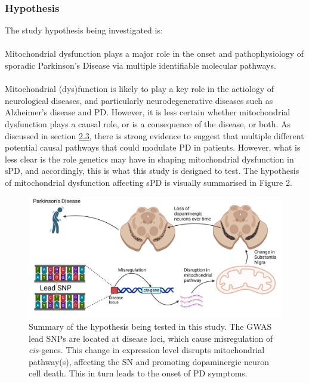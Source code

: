 \documentclass{article}
\begin{document}
\subsubsection{Hypothesis}
\label{subsubsec:hypothesis}
The study hypothesis being investigated is:
\\
\\
Mitochondrial dysfunction plays a major role in the onset and pathophysiology of sporadic Parkinson’s Disease via multiple identifiable molecular pathways.
\\
\\Mitochondrial (dys)function is likely to play a key role in the aetiology of neurological diseases\cite{Bartman2024MitochondrialDiseases}, and particularly neurodegenerative diseases such as Alzheimer's disease and PD\cite{MonzioCompagnoni2020TheDisease}. However, it is less certain whether mitochondrial dysfunction plays a causal role, or is a consequence of the disease, or both. As discussed in section \hyperref[subsubsec:mitochondria]{2.3}, there is strong evidence to suggest that multiple different potential causal pathways that could modulate PD in patients. However, what is less clear is the role genetics may have in shaping mitochondrial dysfunction in sPD, and accordingly, this is what this study is designed to test. The hypothesis of mitochondrial dysfunction affecting sPD is visually summarised in Figure 2.
\begin{figure}[h]
    \centering
    \includegraphics[width=1\linewidth]{Thesis/thesis images/Visualhypothesis.png}
    \caption{Summary of the hypothesis being tested in this study. The GWAS lead SNPs are located at disease loci, which cause misregulation of \textit{cis}-genes. This change in expression level disrupts mitochondrial pathway(s), affecting the SN and promoting dopaminergic neuron cell death. This in turn leads to the onset of PD symptoms.}
    \label{fig:enter-label}
\end{figure}
\end{document}
